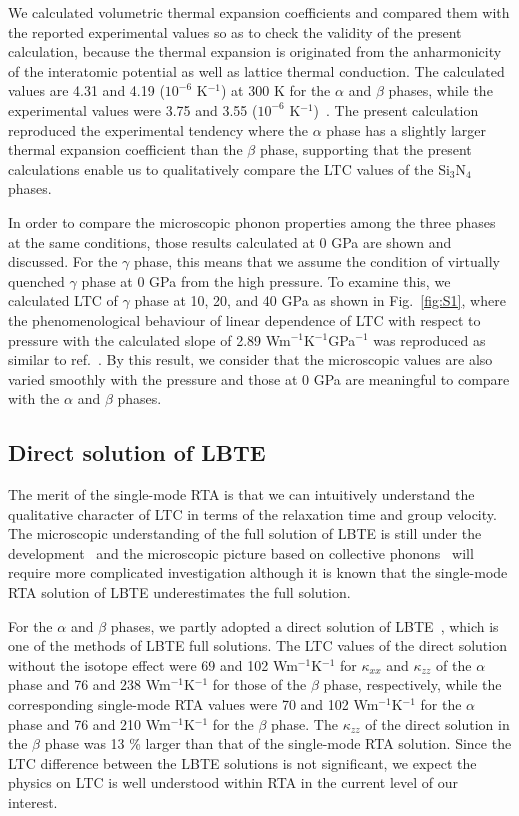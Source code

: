 \documentclass[twocolumn,amsmath,amssymb,a4paper,prb,superscriptaddress,floatfix]{revtex4-1}
\begin{document}
We calculated volumetric thermal expansion coefficients and compared them with
the reported experimental values so as to check the validity of the present
calculation, because the thermal expansion is originated from the anharmonicity
of the interatomic potential as well as lattice thermal conduction. The
calculated values are 4.31 and 4.19 ($10^{-6}$ K$^{-1}$) at 300 K for the
$\alpha$ and $\beta$ phases, while the experimental values were 3.75 and 3.55
($10^{-6}$ K$^{-1}$)~\cite{minikayev-alpha}. The present calculation reproduced
the experimental tendency where the $\alpha$ phase has a slightly larger
thermal expansion coefficient than the $\beta$ phase, supporting that the
present calculations enable us to qualitatively compare the LTC values of the
Si$_3$N$_4$ phases.

In order to compare the microscopic phonon properties among the three phases at
the same conditions, those results calculated at 0 GPa are shown and discussed.
For the $\gamma$ phase, this means that we assume the condition of virtually
quenched $\gamma$ phase at 0 GPa from the high pressure. To examine this, we
calculated LTC of $\gamma$ phase at 10, 20, and 40 GPa as shown in
Fig.~\ref{fig:S1}, where the phenomenological behaviour of linear dependence of
LTC with respect to pressure with the calculated slope of 2.89
Wm$^{-1}$K$^{-1}$GPa$^{-1}$ was reproduced as similar to
ref.~. By this result, we consider that the
microscopic values are also varied smoothly with the pressure and those at 0
GPa are meaningful to compare with the $\alpha$ and $\beta$ phases.

\subsection{Direct solution of LBTE}

The merit of the single-mode RTA is that we can intuitively understand the
qualitative character of LTC in terms of the relaxation time and group
velocity. The microscopic understanding of the full solution of LBTE is still
under the development~\cite{cepellotti-relaxons} and the microscopic picture
based on collective phonons~\cite{hardy-collective} will require more
complicated investigation although it is known that the single-mode RTA solution
of LBTE underestimates the full solution.~\cite{mukhopadhyay-ltc,ward-ltc}

For the $\alpha$ and $\beta$ phases, we partly adopted a direct solution of
LBTE~\cite{chaput-direct}, which is one of the methods of LBTE full solutions.
The LTC values of the direct solution without the isotope effect were  69 and
102 Wm$^{-1}$K$^{-1}$ for $\kappa_{xx}$ and $\kappa_{zz}$  of the $\alpha$ phase
and 76 and 238 Wm$^{-1}$K$^{-1}$ for those of the $\beta$ phase, respectively, while the
corresponding single-mode RTA values were 70 and 102 Wm$^{-1}$K$^{-1}$ for the
$\alpha$ phase and 76 and 210 Wm$^{-1}$K$^{-1}$ for the $\beta$ phase. The
$\kappa_{zz}$ of the direct solution in the $\beta$ phase was 13 \% larger than
that of the single-mode RTA solution. Since the LTC difference between the LBTE
solutions is not significant, we expect the physics on LTC is well
understood within RTA in the current level of our interest.
\end{document}
